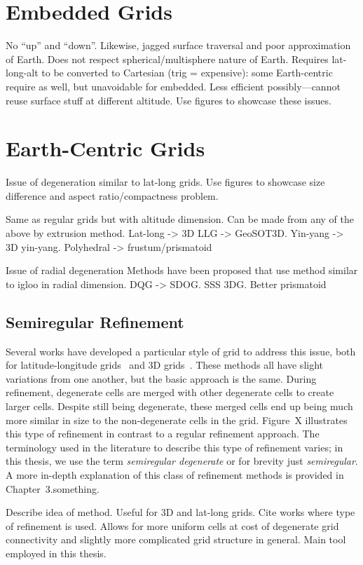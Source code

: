 \section{Embedded Grids}
No ``up'' and ``down''.
Likewise, jagged surface traversal and poor approximation of Earth.
Does not respect spherical/multisphere nature of Earth.
Requires lat-long-alt to be converted to Cartesian (trig = expensive): some Earth-centric require as well, but unavoidable for embedded.
Less efficient possibly---cannot reuse surface stuff at different altitude.
Use figures to showcase these issues.


\section{Earth-Centric Grids}
Issue of degeneration similar to lat-long grids.
Use figures to showcase size difference and aspect ratio/compactness problem.


Same as regular grids but with altitude dimension.
Can be made from any of the above by extrusion method.
Lat-long -> 3D LLG -> GeoSOT3D.
Yin-yang -> 3D yin-yang.
Polyhedral -> frustum/prismatoid
\cite{yoo2019concept}
\cite{sun20153d}
\cite{yoshida2004application}
\cite{kageyama2005geodynamo}
\cite{tackley2008modelling}


Issue of radial degeneration
Methods have been proposed that use method similar to igloo in radial dimension.
DQG -> SDOG.
SSS 3DG.
Better prismatoid
\cite{yu2009sdog}
\cite{yu2012large-scale}
\cite{yu2012lithosphere}
\cite{gang2013sphere} 
\cite{wang2013global}


\subsection{Semiregular Refinement}
Several works have developed a particular style of grid to address this issue, both for latitude-longitude grids~\cite{leopardi2006partition, sun2008global} and 3D grids~\cite{yu2009sdog, gang2013sphere, wang2013global}\cite{others}.
These methods all have slight variations from one another, but the basic approach is the same.
During refinement, degenerate cells are merged with other degenerate cells to create larger cells. %
Despite still being degenerate, these merged cells end up being much more similar in size to the non-degenerate cells in the grid.
Figure~X illustrates this type of refinement in contrast to a regular refinement approach.
The terminology used in the literature to describe this type of refinement varies; in this thesis, we use the term \textit{semiregular degenerate} or for brevity just \textit{semiregular}.
A more in-depth explanation of this class of refinement methods is provided in Chapter~3.something.


Describe idea of method.
Useful for 3D and lat-long grids.
Cite works where type of refinement is used.
Allows for more uniform cells at cost of degenerate grid connectivity and slightly more complicated grid structure in general.
Main tool employed in this thesis.
